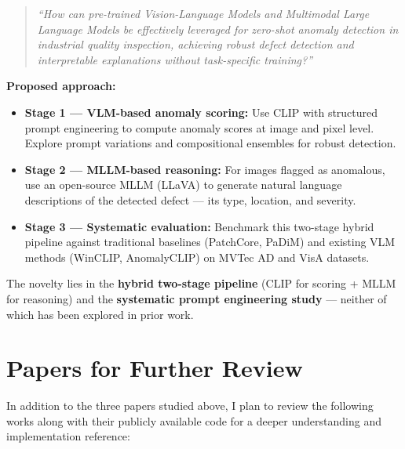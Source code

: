 \documentclass[12pt, a4paper]{article}
\begin{document}
\begin{quote}
\textit{``How can pre-trained Vision-Language Models and Multimodal Large Language Models be effectively leveraged for zero-shot anomaly detection in industrial quality inspection, achieving robust defect detection and interpretable explanations without task-specific training?''}
\end{quote}

\textbf{Proposed approach:}
\begin{itemize}[leftmargin=*]
    \item \textbf{Stage 1 --- VLM-based anomaly scoring:} Use CLIP with structured prompt engineering to compute anomaly scores at image and pixel level. Explore prompt variations and compositional ensembles for robust detection.
    \item \textbf{Stage 2 --- MLLM-based reasoning:} For images flagged as anomalous, use an open-source MLLM (LLaVA) to generate natural language descriptions of the detected defect --- its type, location, and severity.
    \item \textbf{Stage 3 --- Systematic evaluation:} Benchmark this two-stage hybrid pipeline against traditional baselines (PatchCore, PaDiM) and existing VLM methods (WinCLIP, AnomalyCLIP) on MVTec AD and VisA datasets.
\end{itemize}

The novelty lies in the \textbf{hybrid two-stage pipeline} (CLIP for scoring + MLLM for reasoning) and the \textbf{systematic prompt engineering study} --- neither of which has been explored in prior work.

\section{Papers for Further Review}

In addition to the three papers studied above, I plan to review the following works along with their publicly available code for a deeper understanding and implementation reference:
\end{document}

